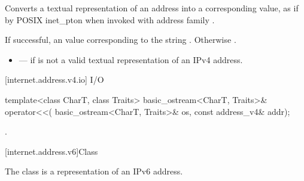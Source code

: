 \begin{itemdescr}
\pnum
\effects Converts a textual representation of an address into a corresponding  value, as if by POSIX inet_pton when invoked with address family .

\pnum
\returns If successful, an  value corresponding to the string . Otherwise .

\pnum
\errors
\begin{itemize}
\item
{} --- if  is not a valid textual representation of an IPv4 address.
\end{itemize}
\end{itemdescr}



[internet.address.v4.io]{ I/O}

%
\begin{itemdecl}
template<class CharT, class Traits>
  basic_ostream<CharT, Traits>& operator<<(
    basic_ostream<CharT, Traits>& os, const address_v4& addr);
\end{itemdecl}

\begin{itemdescr}
\pnum
\returns {}.
\end{itemdescr}




[internet.address.v6]{Class }

\pnum
The class  is a representation of an IPv6 address.

